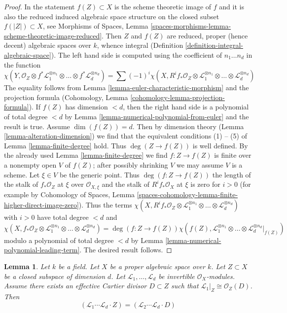 \documentclass{stacks-project}
\theoremstyle{plain}
\newtheorem{lemma}[subsection]{Lemma}
\theoremstyle{definition}
\theoremstyle{remark}
\numberwithin{equation}{subsection}
\begin{document}
\begin{proof}
In the statement $f(Z) \subset X$ is the scheme theoretic image of $f$
and it is also the reduced induced algebraic space structure on the
closed subset $f(|Z|) \subset X$, see Morphisms of Spaces, Lemma
\ref{spaces-morphisms-lemma-scheme-theoretic-image-reduced}.
Then $Z$ and $f(Z)$ are reduced, proper (hence decent) algebraic spaces
over $k$, whence integral
(Definition \ref{definition-integral-algebraic-space}).
The left hand side is computed using the coefficient of $n_1 \ldots n_d$
in the function
$$
\chi(Y, \mathcal{O}_Z \otimes f^*\mathcal{L}_1^{\otimes n_1} \otimes
\ldots \otimes f^*\mathcal{L}_d^{\otimes n_d}) =
\sum (-1)^i
\chi(X, R^if_*\mathcal{O}_Z \otimes
\mathcal{L}_1^{\otimes n_1} \otimes \ldots \otimes
\mathcal{L}_d^{\otimes n_d})
$$
The equality follows from Lemma \ref{lemma-euler-characteristic-morphism}
and the projection formula
(Cohomology, Lemma \ref{cohomology-lemma-projection-formula}).
If $f(Z)$ has dimension $< d$, then the right hand side
is a polynomial of total degree $< d$ by
Lemma \ref{lemma-numerical-polynomial-from-euler}
and the result is true. Assume $\dim(f(Z)) = d$. Then
by dimension theory (Lemma \ref{lemma-alteration-dimension})
we find that the equivalent conditions (1) -- (5) of
Lemma \ref{lemma-finite-degree} hold. Thus
$\deg(Z \to f(Z))$ is well defined.
By the already used Lemma \ref{lemma-finite-degree}
we find $f : Z \to f(Z)$ is finite over a nonempty open
$V$ of $f(Z)$; after possibly shrinking $V$ we may assume
$V$ is a scheme. Let $\xi \in V$ be the generic point.
Thus $\deg(f : Z \to f(Z))$ the length of the stalk of
$f_*\mathcal{O}_Z$ at $\xi$ over $\mathcal{O}_{X, \xi}$
and the stalk of $R^if_*\mathcal{O}_X$ at $\xi$ is zero for $i > 0$
(for example by Cohomology of Spaces, Lemma
\ref{spaces-cohomology-lemma-finite-higher-direct-image-zero}).
Thus the terms $\chi(X, R^if_*\mathcal{O}_Z \otimes
\mathcal{L}_1^{\otimes n_1} \otimes \ldots \otimes
\mathcal{L}_d^{\otimes n_d})$ with $i > 0$ have total
degree $< d$ and
$$
\chi(X, f_*\mathcal{O}_Z \otimes
\mathcal{L}_1^{\otimes n_1} \otimes \ldots \otimes
\mathcal{L}_d^{\otimes n_d})
=
\deg(f : Z \to f(Z)) \chi(f(Z),
\mathcal{L}_1^{\otimes n_1} \otimes \ldots \otimes
\mathcal{L}_d^{\otimes n_d}|_{f(Z)})
$$
modulo a polynomial of total degree $< d$ by
Lemma \ref{lemma-numerical-polynomial-leading-term}.
The desired result follows.
\end{proof}

\begin{lemma}
\label{lemma-numerical-intersection-effective-Cartier-divisor}
Let $k$ be a field. Let $X$ be a proper algebraic space over $k$.
Let $Z \subset X$ be a closed subspace of dimension $d$.
Let $\mathcal{L}_1, \ldots, \mathcal{L}_d$
be invertible $\mathcal{O}_X$-modules. Assume there exists an
effective Cartier divisor $D \subset Z$ such that
$\mathcal{L}_1|_Z \cong \mathcal{O}_Z(D)$. Then
$$
(\mathcal{L}_1 \cdots \mathcal{L}_d \cdot Z) =
(\mathcal{L}_2 \cdots \mathcal{L}_d \cdot D)
$$
\end{lemma}
\end{document}

